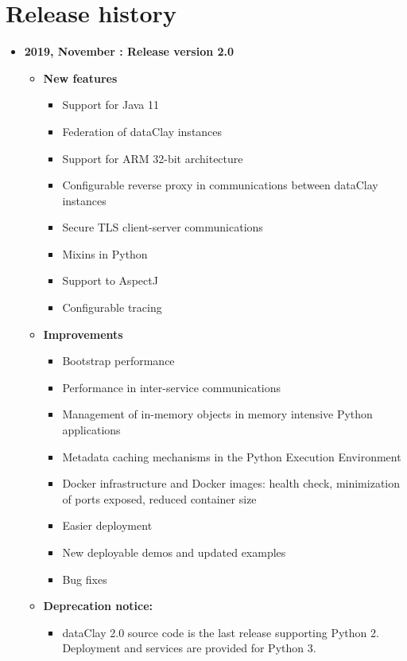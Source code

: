 \chapter*{Release history}

\begin{itemize}
\item[] \textbf{2019, November : Release version 2.0}\newline
    \begin{itemize}
    \item[] \textbf{New features}
        \begin{itemize}
            \item[] Support for Java 11
            \item[] Federation of dataClay instances
            \item[] Support for ARM 32-bit architecture
            \item[] Configurable reverse proxy in communications between dataClay instances
            \item[] Secure TLS client-server communications
            \item[] Mixins in Python
            \item[] Support to AspectJ
            \item[] Configurable tracing
        \end{itemize}
    \item[] \textbf{Improvements}
        \begin{itemize}
            \item[] Bootstrap performance
            \item[] Performance in inter-service communications
            \item[] Management of in-memory objects in memory intensive Python applications
            \item[] Metadata caching mechanisms in the Python Execution Environment
            \item[] Docker infrastructure and Docker images: health check, minimization of ports exposed, reduced container size 
            \item[] Easier deployment
            \item[] New deployable demos and updated examples
            \item[] Bug fixes
        \end{itemize}
    \item[] \textbf{Deprecation notice:}
        \begin{itemize}
            \item[] dataClay 2.0 source code is the last release supporting Python 2. Deployment and services are provided for Python 3.
        \end{itemize}
    \end{itemize}
\end{itemize}
